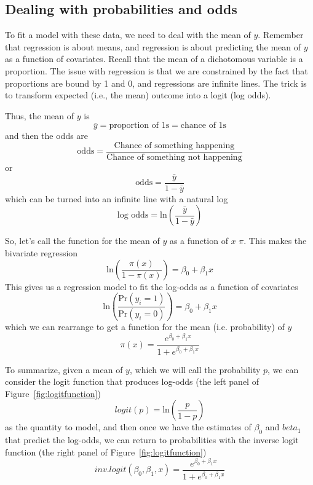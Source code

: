 \subsection{Dealing with probabilities and odds}

To fit a model with these data, we need to deal with the mean of $y$. Remember that regression is about means, and regression is about predicting the mean of $y$ as a function of covariates. Recall that the mean of a dichotomous variable is a proportion. The issue with regression is that we are constrained by the fact that proportions are bound by 1 and 0, and regressions are infinite lines. The trick is to transform expected (i.e., the mean) outcome into a logit (log odds).

Thus, the mean of $y$ is
\begin{equation}
\bar{y} = \mbox{proportion of 1s} = \mbox{chance of 1s}
\end{equation}
and then the odds are
\[
\mbox{odds} = \frac{\mbox{Chance of something happening}}{\mbox{Chance of something not happening}}
\]
or
\begin{equation}
\mbox{odds} = \frac{\bar{y}}{1-\bar{y}}
\end{equation}
which can be turned into an infinite line with a natural log
\begin{equation}
\mbox{log odds} = \mbox{ln}\left(\frac{\bar{y}}{1-\bar{y}}\right)
\end{equation}

So, let's call the function for the mean of $y$ as a function of $x$ $\pi$. This makes the bivariate regression
\begin{equation}
\mbox{ln}\left(\frac{\pi\left(x\right)}{1-\pi\left(x\right)}\right)=\beta_0+\beta_1x
\end{equation}
This gives us a regression model to fit the log-odds as a function of covariates
\begin{equation}
\mbox{ln}\left(\frac{\mbox{Pr}\left(y_i = 1\right)}{\mbox{Pr}\left(y_i = 0\right)}\right)=\beta_0+\beta_1x
\end{equation}
which we can rearrange to get a function for the mean (i.e. probability) of $y$
\begin{equation}
\pi\left(x\right)=\frac{e^{\beta_0+\beta_1x}}{1+e^{\beta_0+\beta_1x}}
\end{equation}

To summarize, given a mean of $y$, which we will call the probability $p$, we can consider the logit function that produces log-odds (the left panel of Figure~\ref{fig:logitfunction})
\begin{equation}
logit(p) = \mbox{ln}\left(\frac{p}{1-p}\right)
\end{equation}
as the quantity to model, and then once we have the estimates of $\beta_0$ and $beta_1$ that predict the log-odds, we can return to probabilities with the inverse logit function (the right panel of Figure~\ref{fig:logitfunction})
\begin{equation}
inv.logit(\beta_0,\beta_1,x)=\frac{e^{\beta_0+\beta_1x}}{1+e^{\beta_0+\beta_1x}}
\end{equation}

